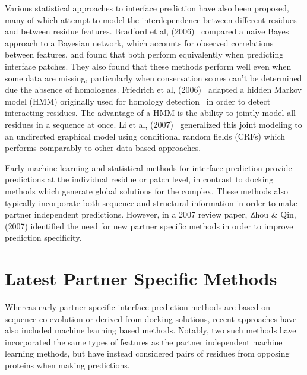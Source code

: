 Various statistical approaches to interface prediction have also been proposed, many of which attempt to model the interdependence between different residues and between residue features.
Bradford et al, (2006)~\cite{bradford2006} compared a naive Bayes approach to a Bayesian network, which accounts for observed correlations between features, and found that both perform equivalently when predicting interface patches.
They also found that these methods perform well even when some data are missing, particularly when conservation scores can't be determined due the absence of homologues.
Friedrich et al, (2006)~\cite{frsiedrich2006} adapted a hidden Markov model (HMM) originally used for homology detection~\cite{eddy1998} in order to detect interacting residues.
The advantage of a HMM is the ability to jointly model all residues in a sequence at once.
Li et al, (2007)~\cite{li2007} generalized this joint modeling to an undirected graphical model using conditional random fields (CRFs) which performs comparably to other data based approaches.

Early machine learning and statistical methods for interface prediction provide predictions at the individual residue or patch level, in contrast to docking methods which generate global solutions for the complex.
These methods also typically incorporate both sequence and structural information in order to make partner independent predictions.
However, in a 2007 review paper, Zhou \& Qin, (2007)\cite{zhou2007} identified the need for new partner specific methods in order to improve prediction specificity.


\section{Latest Partner Specific Methods}

Whereas early partner specific interface prediction methods are based on sequence co-evolution or derived from docking solutions, recent approaches have also included machine learning based methods.
Notably, two such methods have incorporated the same types of features as the partner independent machine learning methods, but have instead considered pairs of residues from opposing proteins when making predictions. 

